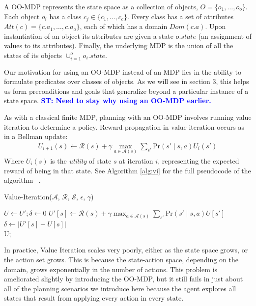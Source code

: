 \documentclass[]{article}
\newcommand{\stnote}[1]{\textcolor{Blue}{\textbf{ST: #1}}}
\begin{document}
A OO-MDP represents the state space as a collection of objects,
$O = \{o_1, \ldots, o_o \}$.  Each object $o_i$ has a
class $c_j \in  \{c_1, \ldots, c_c\}$. Every class has a set of attributes
$Att(c) = \{c.a_1, \ldots, c.a_a \}$, each of which has a domain $Dom(c.a)$.
Upon instantiation of an object its attributes are given a state $o.state$
(an assignment of values to its attributes).  Finally, the underlying MDP is the union
of all the states of its objects $\cup_{i = 1}^o o_i.state$. ~\citep{diuk08}

Our motivation for using an OO-MDP instead of an MDP lies in the
ability to formulate predicates over classes of objects. As we will
see in section 3, this helps us form preconditions and goals that
generalize beyond a particular instance of a state space.
\stnote{Need to stay why using an OO-MDP earlier.}

As with a classical finite MDP, planning with an OO-MDP involves
running value iteration to determine a policy.  Reward propagation in
value iteration occurs as in a Bellman update:
\begin{align}
U_{i+1}(s) \leftarrow \mathcal{R}(s) + \gamma \max_{a \in \mathcal{A}(s)} \sum_{s'} \text{Pr}(s' \mid s, a)U_i(s')
\end{align}
Where $U_i(s)$ is the {\it utility} of state $s$ at iteration $i$, 
representing the expected reward of being in that state. See Algorithm \ref{alg:vi} for the full pseudocode of the algorithm ~\citep{russellnorvigAI}.

\begin{algorithm}
  \caption{Value-Iteration($\mathcal{A}$, $\mathcal{R}$, $\mathcal{S}$, $\epsilon$, $\gamma$)}
  \begin{algorithmic}[1]
    \State $U \gets U';\delta \gets 0$
    \State $U'[s] \leftarrow \mathcal{R}(s) + \gamma \max_{a \in \mathcal{A}(s)} \sum_{s'} \text{Pr}(s'\mid s,a) U[s']$
    	\State $\delta \gets |U'[s] - U[s]|$ 
    \EndIf
    \EndFor
    \EndWhile \\
    \Return U;
  \end{algorithmic}
  \label{alg:vi}
\end{algorithm}


In practice, Value Iteration scales very poorly, either as the state
space grows, or the action set grows. This is because the state-action
space, depending on the domain, grows exponentially in the number of
actions.  This problem is ameliorated slightly by introducing the
OO-MDP, but it still fails in just about all of the planning scenarios
we introduce here because the agent explores all states that result
from applying every action in every state.  
\end{document}
